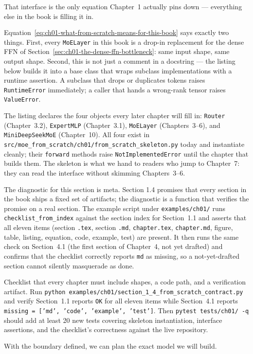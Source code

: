 That interface is the only equation Chapter~1 actually pins down --- everything else in the book is filling it in.



Equation~\ref{eq:ch01-what-from-scratch-means-for-this-book} says exactly two things. First, every \texttt{MoELayer} in this book is a drop-in replacement for the dense FFN of Section~\ref{sec:ch01-the-dense-ffn-bottleneck}: same input shape, same output shape. Second, this is not just a comment in a docstring --- the listing below builds it into a base class that wraps subclass implementations with a runtime assertion. A subclass that drops or duplicates tokens raises \texttt{RuntimeError} immediately; a caller that hands a wrong-rank tensor raises \texttt{ValueError}.



The listing declares the four objects every later chapter will fill in: \texttt{Router} (Chapter~3.2), \texttt{ExpertMLP} (Chapter~3.1), \texttt{MoELayer} (Chapters~3--6), and \texttt{MiniDeepSeekMoE} (Chapter~10). All four exist in \texttt{src/moe\_from\_scratch/ch01/from\_scratch\_skeleton.py} today and instantiate cleanly; their \texttt{forward} methods raise \texttt{NotImplementedError} until the chapter that builds them. The skeleton is what we hand to readers who jump to Chapter~7: they can read the interface without skimming Chapters~3--6.

The diagnostic for this section is meta. Section 1.4 promises that every section in the book ships a fixed set of artifacts; the diagnostic is a function that verifies the promise on a real section. The example script under \texttt{examples/ch01/} runs \texttt{checklist\_from\_index} against the section index for Section~1.1 and asserts that all eleven items (section \texttt{.tex}, section \texttt{.md}, \texttt{chapter.tex}, \texttt{chapter.md}, figure, table, listing, equation, code, example, test) are present. It then runs the same check on Section~4.1 (the first section of Chapter~4, not yet drafted) and confirms that the checklist correctly reports \texttt{md} as missing, so a not-yet-drafted section cannot silently masquerade as done.

\begin{checkpointbox}
Checklist that every chapter must include shapes, a code path, and a verification artifact. Run \texttt{python examples/ch01/section\_1\_4\_from\_scratch\_contract.py} and verify Section~1.1 reports \texttt{OK} for all eleven items while Section~4.1 reports \texttt{missing = ['md', 'code', 'example', 'test']}. Then \texttt{pytest tests/ch01/ -q} should add at least 20 new tests covering skeleton instantiation, interface assertions, and the checklist's correctness against the live repository.
\end{checkpointbox}

With the boundary defined, we can plan the exact model we will build.
